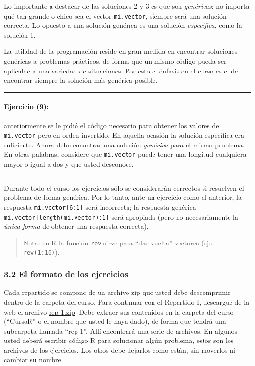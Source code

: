\documentclass[]{article}
\begin{document}
Lo importante a destacar de las soluciones 2 y 3 es que son
\emph{genéricas}: no importa qué tan grande o chico sea el vector
\texttt{mi.vector}, siempre será una solución correcta. Lo opuesto a una
solución genérica es una solución \emph{específica}, como la solución 1.

La utilidad de la programación reside en gran medida en encontrar
soluciones genéricas a problemas prácticos, de forma que un mismo código
pueda ser aplicable a una variedad de situaciones. Por esto el énfasis
en el curso es el de encontrar siempre la solución más genérica posible.

\begin{center}\rule{3in}{0.4pt}\end{center}

\paragraph{Ejercicio (9):}

anteriormente se le pidió el código necesario para obtener los valores
de \texttt{mi.vector} pero en orden invertido. En aquella ocasión la
solución específica era suficiente. Ahora debe encontrar una solución
\emph{genérica} para el mismo problema. En otras palabras, considere que
\texttt{mi.vector} puede tener una longitud cualquiera mayor o igual a
dos y que usted desconoce.

\begin{center}\rule{3in}{0.4pt}\end{center}

Durante todo el curso los ejercicios sólo se considerarán correctos si
resuelven el problema de forma genérica. Por lo tanto, ante un ejercicio
como el anterior, la respuesta \texttt{mi.vector{[}6:1{]}} será
incorrecta; la respuesta genérica
\texttt{mi.vector{[}length(mi.vector):1{]}} será apropiada (pero no
necesariamente la \emph{única forma} de obtener una respuesta correcta).

\begin{quote}
Nota: en R la función \texttt{rev} sirve para ``dar vuelta'' vectores
(ej.: \texttt{rev(1:10)}).

\end{quote}
\subsubsection{3.2 El formato de los ejercicios}

Cada repartido se compone de un archivo zip que usted debe descomprimir
dentro de la carpeta del curso. Para continuar con el Repartido I,
descargue de la web el archivo \href{http://goo.gl/2evbBS}{rep-1.zip}.
Debe extraer sus contenidos en la carpeta del curso (``CursoR'' o el
nombre que usted le haya dado), de forma que tendrá una subcarpeta
llamada ``rep-1''. Allí encontrará una serie de archivos. En algunos
usted deberá escribir código R para solucionar algún problema, estos son
los archivos de los ejercicios. Los otros debe dejarlos como están, sin
moverlos ni cambiar su nombre.
\end{document}
